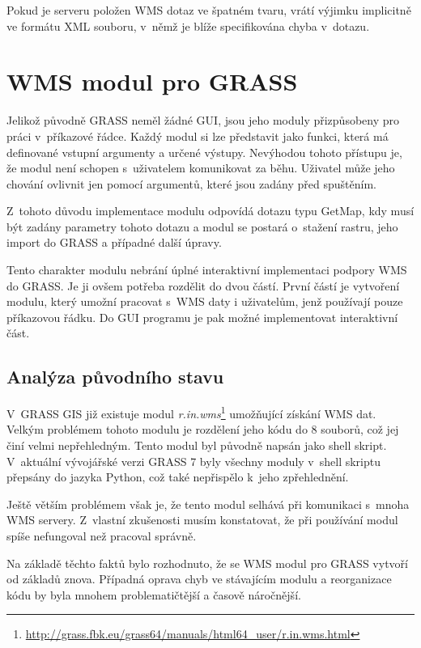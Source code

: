 \documentclass[a4paper,12pt]{article}
\begin{document}
Pokud je serveru položen WMS dotaz ve špatném tvaru, vrátí výjimku
implicitně ve formátu XML souboru, v~němž je blíže specifikována chyba
v~dotazu.


\newpage

\section{WMS modul pro GRASS}

Jelikož původně GRASS neměl žádné GUI, jsou jeho moduly přizpůsobeny
pro práci v~příkazové řádce. Každý modul si lze představit jako
funkci, která má definované vstupní argumenty a určené
výstupy. Nevýhodou tohoto přístupu je, že modul není schopen
s~uživatelem komunikovat za běhu. Uživatel může jeho chování ovlivnit
jen pomocí argumentů, které jsou zadány před spuštěním.

Z~tohoto důvodu implementace modulu odpovídá dotazu typu GetMap, kdy
musí být zadány parametry tohoto dotazu a modul se postará
o~stažení rastru, jeho import do GRASS a případné další úpravy.


Tento charakter modulu nebrání úplné interaktivní implementaci 
podpory WMS
do GRASS. Je ji ovšem potřeba rozdělit do dvou částí. První částí je
vytvoření modulu, který umožní pracovat s~WMS daty i uživatelům,
jenž používají pouze příkazovou řádku.  Do GUI programu je pak možné
implementovat interaktivní část.


\subsection{Analýza původního stavu}

V~GRASS GIS již existuje modul \emph{r.in.wms}\footnote{\url{http://grass.fbk.eu/grass64/manuals/html64_user/r.in.wms.html}} umožňující získání WMS dat.
Velkým problémem tohoto modulu je rozdělení jeho kódu do 8 souborů,
což jej činí velmi nepřehledným.  Tento modul byl původně napsán jako
shell skript. V~aktuální vývojářské verzi GRASS 7 byly všechny 
moduly v~shell skriptu přepsány do
jazyka Python, což také nepřispělo k~jeho zpřehlednění.

Ještě větším problémem však je, že tento modul selhává při komunikaci
s~mnoha WMS servery. Z~vlastní zkušenosti musím konstatovat, že při
používání modul spíše nefungoval než pracoval správně.

Na základě těchto faktů bylo rozhodnuto, že se WMS modul pro GRASS
vytvoří od základů znova. Případná oprava chyb ve stávajícím modulu a
reorganizace kódu by byla mnohem problematičtější a časově náročnější.
\end{document}
